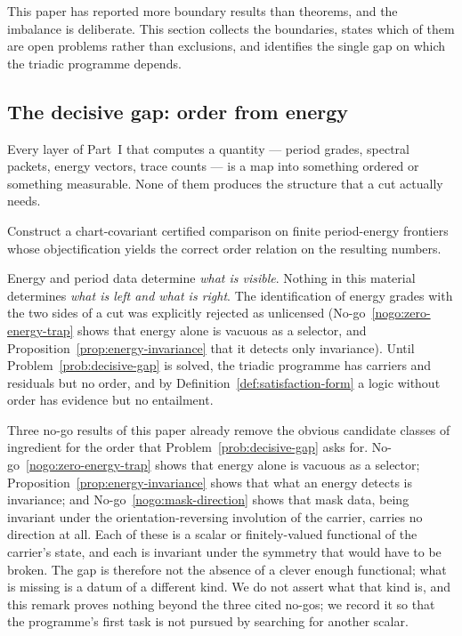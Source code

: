 \label{sec:boundaries-body}

This paper has reported more boundary results than theorems, and the imbalance is
deliberate.  This section collects the boundaries, states which of them are open problems
rather than exclusions, and identifies the single gap on which the triadic programme
depends.

\subsection{The decisive gap: order from energy}

Every layer of Part~I that computes a quantity --- period grades, spectral packets, energy
vectors, trace counts --- is a map into something ordered or something measurable.  None of
them produces the structure that a cut actually needs.

\begin{problem}\label{prob:order-from-energy}
\label{prob:decisive-gap}
Construct a chart-covariant certified comparison on finite period-energy frontiers whose
objectification yields the correct order relation on the resulting numbers.
\end{problem}

\begin{remark}
Energy and period data determine \emph{what is visible}.  Nothing in this material
determines \emph{what is left and what is right}.  The identification of energy grades with
the two sides of a cut was explicitly rejected as unlicensed
(No-go~\ref{nogo:zero-energy-trap} shows that energy alone is vacuous as a selector, and
Proposition~\ref{prop:energy-invariance} that it detects only invariance).  Until
Problem~\ref{prob:decisive-gap} is solved, the triadic programme has carriers and residuals
but no order, and by Definition~\ref{def:satisfaction-form} a logic without order has
evidence but no entailment.
\end{remark}

\begin{remark}
\label{rem:gap-is-not-scarcity}
Three no-go results of this paper already remove the obvious candidate classes of
ingredient for the order that Problem~\ref{prob:decisive-gap} asks for.
No-go~\ref{nogo:zero-energy-trap} shows that energy alone is vacuous as a selector;
Proposition~\ref{prop:energy-invariance} shows that what an energy detects is
invariance; and No-go~\ref{nogo:mask-direction} shows that mask data, being
invariant under the orientation-reversing involution of the carrier, carries no
direction at all.  Each of these is a scalar or finitely-valued functional of the
carrier's state, and each is invariant under the symmetry that would have to be
broken.  The gap is therefore not the absence of a clever enough functional; what
is missing is a datum of a different kind.  We do not assert what that kind is, and
this remark proves nothing beyond the three cited no-gos; we record it so that the
programme's first task is not pursued by searching for another scalar.
\end{remark}

